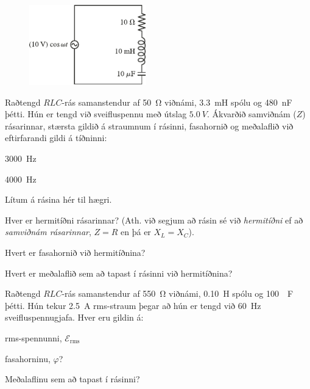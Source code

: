 \begin{enumerate}[label = \textbf{(\alph*)}]

\begin{minipage}{\linewidth}
\begin{figure}
\vspace{-0.5cm}
\includegraphics[width = 2in]{figures/rk3232.pdf}
\end{figure}


\item[\textbf{(32.30)}] Raðtengd $RLC$-rás samanstendur af \SI{50}{\ohm} viðnámi, \SI{3.3}{mH} spólu og \SI{480}{nF} þétti. Hún er tengd við sveifluspennu með útslag $\SI{5.0}{V}$. Ákvarðið samviðnám ($Z$) rásarinnar, stærsta gildið á straumnum í rásinni, fasahornið og meðalaflið við eftirfarandi gildi á tíðninni: \begin{enumerate*}[label = \textbf{(\alph*)}]
    \item \SI{3000}{Hz} \item \SI{4000}{Hz}
\end{enumerate*}

\item[\textbf{(32.32)}] Lítum á rásina hér til hægri. \begin{enumerate*}[label = \textbf{(\alph*)}]
    \item Hver er hermitíðni rásarinnar? (Ath. við segjum að rásin sé við \emph{hermitíðni} ef að \emph{samviðnám rásarinnar}, $Z = R$ en þá er $X_L = X_C$).
    \item Hvert er fasahornið við hermitíðnina?
    \item Hvert er meðalaflið sem að tapast í rásinni við hermitíðnina?
\end{enumerate*}

\end{minipage}

\vspace{0.25cm}

\item[\textbf{(32.52)}] Raðtengd $RLC$-rás samanstendur af \SI{550}{\ohm} viðnámi, \SI{0.10}{H} spólu og \SI{100}{\mu F} þétti. Hún tekur \SI{2.5}{A} rms-straum þegar að hún er tengd við \SI{60}{Hz} sveifluspennugjafa. Hver eru gildin á: \begin{enumerate*}[label = \textbf{(\alph*)}]
    \item rms-spennunni, $\mathcal{E}_{\text{rms}}$
    \item fasahorninu, $\varphi$?
    \item Meðalaflinu sem að tapast í rásinni?
\end{enumerate*}


\end{enumerate}
